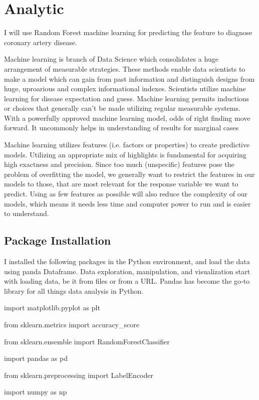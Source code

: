 \documentclass[sigconf]{acmart}
\begin{document}
\section{Analytic}
I will use Random Forest machine learning for predicting the feature to diagnose coronary artery disease.

Machine learning is branch of Data Science which consolidates a huge arrangement of measurable strategies. These methods enable data scientists to make a model which can gain from past information and distinguish designs from huge, uproarious and complex informational indexes. Scientists utilize machine learning for disease expectation and guess. Machine learning permits inductions or choices that generally can't be made utilizing regular measurable systems. With a powerfully approved machine learning model, odds of right finding move forward. It uncommonly helps in understanding of results for marginal cases

Machine learning utilizes features (i.e. factors or properties) to create predictive models. Utilizing an appropriate mix of highlights is fundamental for acquiring high exactness and precision. Since too much (unspecific) features pose the problem of overfitting the model, we generally want to restrict the features in our models to those, that are most relevant for the response variable we want to predict. Using as few features as possible will also reduce the complexity of our models, which means it needs less time and computer power to run and is easier to understand.

\subsection{Package Installation}

I installed the following packages in the Python environment, and load the data using panda Dataframe. Data exploration, manipulation, and visualization start with loading data, be it from files or from a URL. Pandas has become the go-to library for all things data analysis in Python.

import matplotlib.pyplot as plt

from sklearn.metrics import accuracy_score

from sklearn.ensemble import RandomForestClassifier

import pandas as pd

from sklearn.preprocessing import LabelEncoder

import numpy as np
\end{document}
